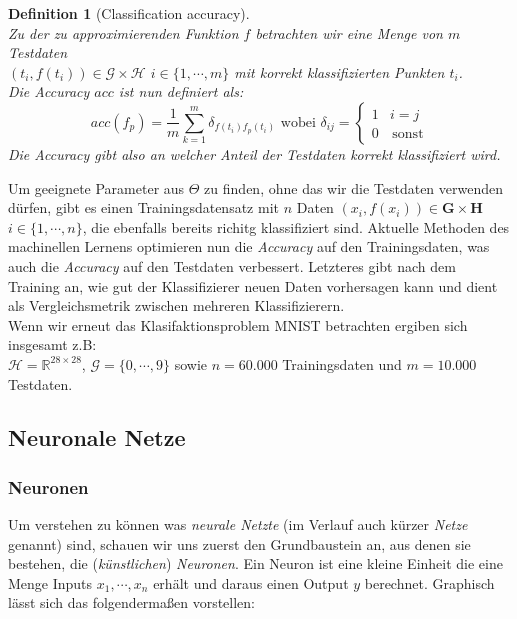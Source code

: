\documentclass[]{scrartcl}
\newtheorem{defi}[satz]{Definition}
\begin{document}
		\begin{defi}[Classification accuracy] ~\\
			Zu der zu approximierenden Funktion $f$ betrachten wir eine Menge von $m$ Testdaten \\
			$(t_i, f(t_i)) \in \mathcal{G} \times \mathcal{H}$ $i \in \{1, \cdots , m\}$ mit korrekt klassifizierten Punkten $t_i$. \\
			Die Accuracy $acc$ ist nun definiert als:
			$$ acc(f_p) = \frac{1}{m} \sum_{k=1}^m \delta_{f(t_i)f_p(t_i)} \text{ wobei } \delta_{ij} =
			\begin{cases}
				1 & i = j \\
				0 & \, \text{sonst}
			\end{cases}$$
			Die Accuracy gibt also an welcher Anteil der Testdaten korrekt klassifiziert wird.
		\end{defi}

		Um geeignete Parameter aus $\Theta$ zu finden, ohne das wir die Testdaten verwenden dürfen, gibt es einen Trainingsdatensatz mit $n$ Daten
		$(x_i, f(x_i)) \in \mathbf{G} \times \mathbf{H}$ $i \in \{1, \cdots , n\}$, die ebenfalls bereits richitg klassifiziert sind.
		Aktuelle Methoden des machinellen Lernens optimieren nun die \textit{Accuracy} auf den Trainingsdaten, was auch die \textit{Accuracy} auf den
		Testdaten verbessert. Letzteres gibt nach dem Training an, wie gut der Klassifizierer neuen Daten vorhersagen kann
		und dient als Vergleichsmetrik zwischen mehreren Klassifizierern.\\

		Wenn wir erneut das Klasifaktionsproblem MNIST betrachten ergiben sich insgesamt z.B: \\
		$\mathcal{H} = \mathbb{R}^{28 \times 28}$, $\mathcal{G} = \{0, \cdots, 9\}$ sowie $n = 60.000$ Trainingsdaten und $m = 10.000$ Testdaten.


	\subsection{Neuronale Netze}\label{nets}
		
		\subsubsection{Neuronen}

			Um verstehen zu können was \textit{neurale Netzte} (im Verlauf auch kürzer \textit{Netze} genannt) sind, schauen wir uns zuerst den Grundbaustein an, aus denen sie bestehen,
			die (\textit{künstlichen}) \textit{Neuronen}.
			Ein Neuron ist eine kleine Einheit die eine Menge Inputs $x_1, \cdots, x_n$ erhält und daraus einen Output $y$ berechnet.
			Graphisch lässt sich das folgendermaßen vorstellen:
\end{document}
